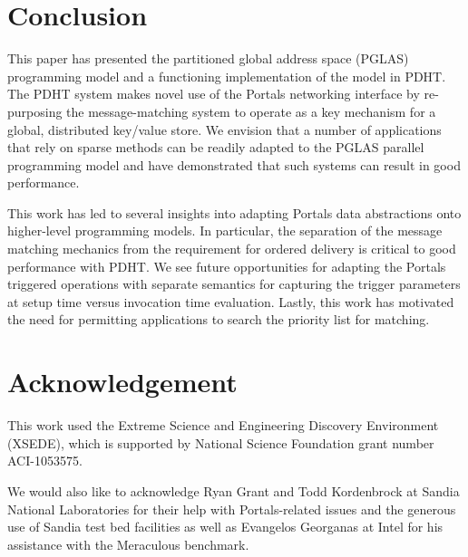 \section{Conclusion}

This paper has presented the partitioned global address space (PGLAS)
programming model and a functioning implementation of the model in
PDHT. The PDHT system makes novel use of the Portals networking interface
by re-purposing the message-matching system to operate as a key mechanism
for a global, distributed key/value store. We envision that a number of
applications that rely on sparse methods can be readily adapted to the PGLAS
parallel programming model and have demonstrated that such systems can 
result in good performance.

This work has led to several insights into adapting Portals data abstractions
onto higher-level programming models. In particular, the separation of the
message matching mechanics from the requirement for ordered delivery is
critical to good performance with PDHT. We see future opportunities for
adapting the Portals triggered operations with separate semantics for capturing
the trigger parameters at setup time versus invocation time evaluation. Lastly, 
this work has motivated the need for permitting applications to search
the priority list for matching.

\section*{Acknowledgement}

This work used the Extreme Science and Engineering Discovery Environment
(XSEDE), which is supported by National Science Foundation grant number
ACI-1053575.

We would also like to acknowledge Ryan Grant and Todd Kordenbrock at Sandia
National Laboratories for their help with Portals-related issues and the
generous use of Sandia test bed facilities as well as Evangelos Georganas at
Intel for his assistance with the Meraculous benchmark.
